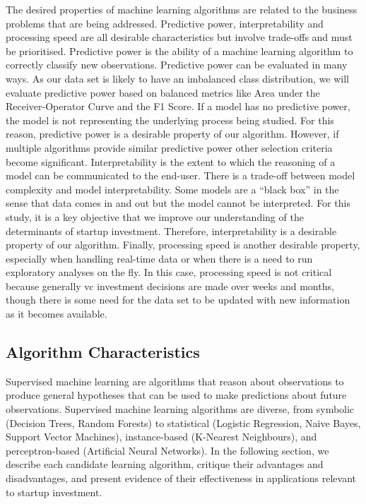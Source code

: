 \documentclass[../thesis/thesis.tex]{subfiles}
\begin{document}
The desired properties of machine learning algorithms are related to the business problems that are being addressed. Predictive power, interpretability and processing speed are all desirable characteristics but involve trade-offs and must be prioritised. Predictive power is the ability of a machine learning algorithm to correctly classify new observations. Predictive power can be evaluated in many ways. As our data set is likely to have an imbalanced class distribution, we will evaluate predictive power based on balanced metrics like Area under the Receiver-Operator Curve and the F1 Score. If a model has no predictive power, the model is not representing the underlying process being studied. For this reason, predictive power is a desirable property of our algorithm. However, if multiple algorithms provide similar predictive power other selection criteria become significant. Interpretability is the extent to which the reasoning of a model can be communicated to the end-user. There is a trade-off between model complexity and model interpretability. Some models are a ``black box'' in the sense that data comes in and out but the model cannot be interpreted. For this study, it is a key objective that we improve our understanding of the determinants of startup investment. Therefore, interpretability is a desirable property of our algorithm. Finally, processing speed is another desirable property, especially when handling real-time data or when there is a need to run exploratory analyses on the fly. In this case, processing speed is not critical because generally \gls{vc} investment decisions are made over weeks and months, though there is some need for the data set to be updated with new information as it becomes available.

\subsection{Algorithm Characteristics}

Supervised machine learning are algorithms that reason about observations to produce general hypotheses that can be used to make predictions about future observations. Supervised machine learning algorithms are diverse, from symbolic (Decision Trees, Random Forests) to statistical (Logistic Regression, Naive Bayes, Support Vector Machines), instance-based (K-Nearest Neighbours), and perceptron-based (Artificial Neural Networks). In the following section, we describe each candidate learning algorithm, critique their advantages and disadvantages, and present evidence of their effectiveness in applications relevant to startup investment.
\end{document}
